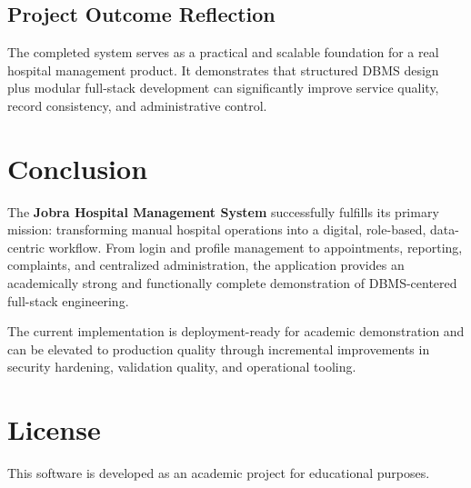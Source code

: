 \documentclass[12pt,a4paper]{article}
\begin{document}
\subsection{Project Outcome Reflection}
The completed system serves as a practical and scalable foundation for a real hospital management product. It demonstrates that structured DBMS design plus modular full-stack development can significantly improve service quality, record consistency, and administrative control.

\section{Conclusion}
The \textbf{Jobra Hospital Management System} successfully fulfills its primary mission: transforming manual hospital operations into a digital, role-based, data-centric workflow. From login and profile management to appointments, reporting, complaints, and centralized administration, the application provides an academically strong and functionally complete demonstration of DBMS-centered full-stack engineering.

The current implementation is deployment-ready for academic demonstration and can be elevated to production quality through incremental improvements in security hardening, validation quality, and operational tooling.

\section*{License}
This software is developed as an academic project for educational purposes.
\end{document}
